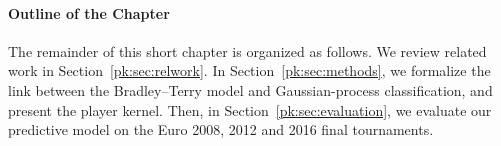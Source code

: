 \paragraph{Outline of the Chapter}
The remainder of this short chapter is organized as follows.
We review related work in Section~\ref{pk:sec:relwork}.
In Section~\ref{pk:sec:methods}, we formalize the link between the Bradley--Terry model and Gaussian-process classification, and present the player kernel.
Then, in Section~\ref{pk:sec:evaluation}, we evaluate our predictive model on the Euro 2008, 2012 and 2016 final tournaments.
